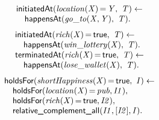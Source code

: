 \documentclass[8pt]{beamer}
\DeclareMathOperator{\val}{=}  %
\def \patsize {}
\def\happensAt{\textsf{\patsize happensAt}}
\def\holdsFor{\textsf{\patsize holdsFor}}
\def\initiatedAt{\textsf{\patsize initiatedAt}}
\def\terminatedAt{\textsf{\patsize terminatedAt}}
\def\complementall{\textsf{\patsize relative\_complement\_all}}
\def\true{\textsf{\patsize true}}
\newenvironment{mysplit}%
  {\arraycolsep 0pt \begin{array}{l}}%
  {\end{array}}
\begin{document}
\begin{frame}
\begin{minipage}{0.48\linewidth}
        \begin{align*}
            \begin{mysplit}
                \initiatedAt\mathit{(location(X)\val Y,\ T) \leftarrow}\\
                \quad    \happensAt\mathit{(go\_to(X,Y),\ T).}
            \end{mysplit}
        \end{align*}
        \begin{align*}
            \begin{mysplit}
                \initiatedAt\mathit{(rich(X)\val\true,\ T) \leftarrow}\\
                \quad    \happensAt\mathit{(win\_lottery(X),\ T).}\\
                \terminatedAt\mathit{(rich(X)\val\true,\ T) \leftarrow}\\
                \quad    \happensAt\mathit{(lose\_wallet(X),\ T)}.\\
            \end{mysplit}
        \end{align*}
        \begin{align*}
            \begin{mysplit}
                \holdsFor\mathit{(shortHappiness(X)\val\true,\ I) \leftarrow}\\
                \quad    \holdsFor\mathit{(location(X)\val pub,I1)},\\
                \quad    \holdsFor\mathit{(rich(X)\val\true,I2)},\\
                \quad    \complementall\mathit{(I1,[I2],I)}.\\
            \end{mysplit}
        \end{align*}
    \end{minipage}

\end{frame}
\end{document}
